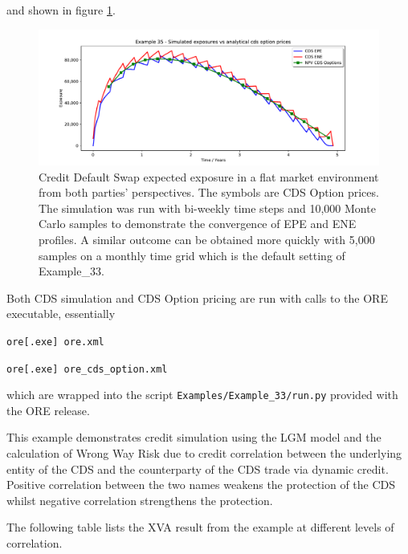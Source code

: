 \documentclass[12pt, a4paper]{article}
\begin{document}
and shown in figure \ref{fig_33}. 
\begin{figure}[h!]
\begin{center}
\includegraphics[scale=0.45]{mpl_cds_33_2w_10k.pdf}
\end{center}
\caption{Credit Default Swap expected exposure in a flat market environment from both parties' perspectives. The symbols are CDS Option prices. The simulation was run with bi-weekly time steps and 10,000 Monte Carlo samples to demonstrate the convergence of EPE and ENE profiles. A similar
outcome can be obtained more quickly with 5,000 samples on a monthly time grid which is the default setting of Example\_33. }
\label{fig_33}
\end{figure}
Both CDS simulation and CDS Option pricing are run with calls to the ORE executable, essentially 

\medskip
\centerline{\tt ore[.exe] ore.xml} 

\centerline{\tt ore[.exe] ore\_cds\_option.xml} 
\medskip

which are wrapped into the script {\tt Examples/Example\_33/run.py} provided with the ORE release.

This example demonstrates credit simulation using the LGM model and the calculation of Wrong Way Risk due to credit
correlation between the underlying entity of the CDS and the counterparty of the CDS trade via dynamic credit.
Positive correlation between the two names weakens the protection of the CDS whilst
negative correlation strengthens the protection.

The following table lists the XVA result from the example at different levels of correlation.
\end{document}
